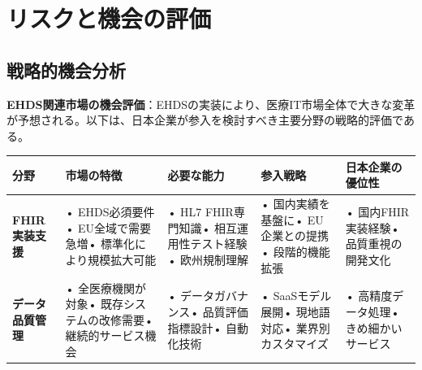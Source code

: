 \documentclass[
  a4paper,
  a4paper,
  11pt]{ltjsbook}
\begin{document}
\section{リスクと機会の評価}\label{ux30eaux30b9ux30afux3068ux6a5fux4f1aux306eux8a55ux4fa1}

\subsection{戦略的機会分析}\label{ux6226ux7565ux7684ux6a5fux4f1aux5206ux6790}

\textbf{EHDS関連市場の機会評価}：EHDSの実装により、医療IT市場全体で大きな変革が予想される。以下は、日本企業が参入を検討すべき主要分野の戦略的評価である。

\begin{longtable}[]{@{}
  >{\raggedright\arraybackslash}p{}
  >{\raggedright\arraybackslash}p{}
  >{\raggedright\arraybackslash}p{}
  >{\raggedright\arraybackslash}p{}
  >{\raggedright\arraybackslash}p{}@{}}
\toprule\noalign{}
\begin{minipage}[b]{\linewidth}\raggedright
分野
\end{minipage} & \begin{minipage}[b]{\linewidth}\raggedright
市場の特徴
\end{minipage} & \begin{minipage}[b]{\linewidth}\raggedright
必要な能力
\end{minipage} & \begin{minipage}[b]{\linewidth}\raggedright
参入戦略
\end{minipage} & \begin{minipage}[b]{\linewidth}\raggedright
日本企業の優位性
\end{minipage} \\
\midrule\noalign{}
\endhead
\bottomrule\noalign{}
\endlastfoot
\textbf{FHIR実装支援} & • EHDS必須要件• EU全域で需要急増•
標準化により規模拡大可能 & • HL7 FHIR専門知識• 相互運用性テスト経験•
欧州規制理解 & • 国内実績を基盤に• EU企業との提携• 段階的機能拡張 & •
国内FHIR実装経験• 品質重視の開発文化 \\
\textbf{データ品質管理} & • 全医療機関が対象• 既存システムの改修需要•
継続的サービス機会 & • データガバナンス• 品質評価指標設計• 自動化技術 &
• SaaSモデル展開• 現地語対応• 業界別カスタマイズ & • 高精度データ処理•
きめ細かいサービス \\

\end{longtable}
\end{document}
